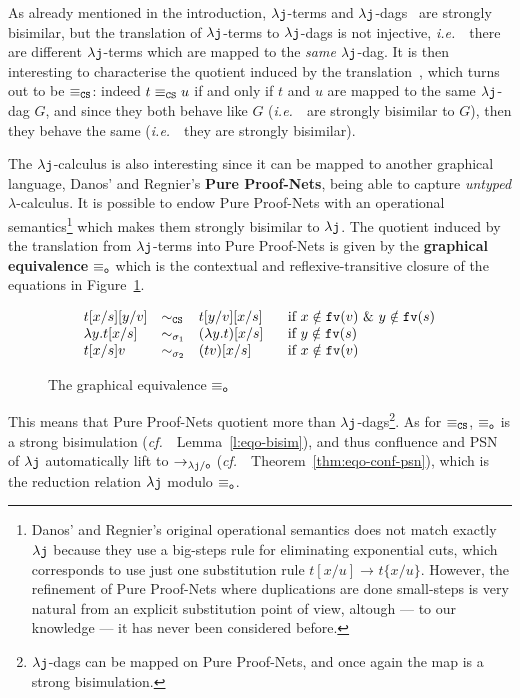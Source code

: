 \documentclass{LMCS}
\newcommand{\ie}{{\it  i.e.}~}
\newcommand{\cf}{{\it  cf.}~}
\renewcommand{\>}{\rightarrow}
\def\lam{\lambda}
\newcommand{\Rew}[1]{\rightarrow_{#1}}
\newcommand{\isubs}[1]{ \{ #1  \} }
\newcommand{\dis}{{\tt j}}
\newcommand{\ldis}{\lam{\dis}}
\newcommand{\lj}{\lam{\dis}}
\newcommand{\fv}[1]{{\tt fv}(#1)}
\newcommand{\CS}{{\tt CS}}
\newcommand{\deft}[1]{{\bf #1}}
\newcommand{\modulo}[2]{#1/#2}
\newcommand{\eqo}{\equiv_\osym}
\newcommand{\preeq}{\sim}
\newcommand{\osym}{{\tt o}}
\newcommand{\preeqsigu}{\preeq_{\sigma_1}}
\newcommand{\preeqsigt}{\preeq_{\sigma_2}}
\newcommand{\eqcs}{\equiv_\CS}
\begin{document}
As already mentioned in the introduction, 
 $\lj$-terms and
$\lj$-dags~\cite{AccattoliTh} are strongly bisimilar, 
but the translation of $\lj$-terms to $\lj$-dags is not
injective, \ie\ there are different $\lj$-terms 
which are mapped to the \textit{same} $\lj$-dag. 
It is then interesting to characterise  the quotient induced by the
translation~\cite{AccattoliTh}, which turns out to be $\eqcs$: indeed $t\eqcs u$ if and only if $t$ and
$u$ are mapped to the same $\lj$-dag $G$, and since they both behave
like $G$ (\ie\  are strongly bisimilar to $G$), then  they behave the same
(\ie\  they are strongly bisimilar).\medskip

The $\lj$-calculus is also 
interesting since it can be mapped
 to another graphical language, Danos' and Regnier's \deft{Pure
  Proof-Nets}, being able to capture
\textit{untyped} $\lam$-calculus. It is possible to endow Pure Proof-Nets
with an operational semantics\footnote{Danos' and Regnier's original
  operational semantics does not match exactly $\lj$ because they use
  a big-steps rule for eliminating exponential cuts, which corresponds
  to use just one substitution rule
  $t[x/u]\Rew{}t\isubs{x/u}$. However, the refinement of Pure
  Proof-Nets where duplications are done small-steps is very natural
  from an explicit substitution point of view, altough --- to our
  knowledge --- it has never been considered before.} which makes them
strongly bisimilar to $\lj$. The quotient
induced by the translation  from $\lj$-terms into Pure Proof-Nets is
given by the \deft{graphical equivalence} $\eqo$ 
which is the contextual
and reflexive-transitive closure of the 
equations in Figure~\ref{f:eqo}. 


\begin{figure}[ht]
\[ \begin{array}{lll@{\hspace{.5cm}}l}
   t[x/s][y/v] & \sim_{\CS} & t[y/v][x/s] & \mbox{ if } x\notin\fv{v}\ \&\ y\notin\fv{s}  \\
   \lam y. t [x/s] & \preeqsigu & (\lam y. t) [x/s]  & \mbox{ if } y\notin \fv{s} \\
   t[x/s] v & \preeqsigt & (t v)[x/s]& \mbox{ if } x\notin\fv{v} \\
   \end{array} \]
\caption{The graphical  equivalence $\eqo$} 
\label{f:eqo}
\end{figure}

This means that Pure Proof-Nets quotient more than
$\lj$-dags\footnote{$\lj$-dags can be mapped on Pure Proof-Nets, and
  once again the map is a strong bisimulation.}. As
for $\equiv_{\CS}$, $\eqo$ is a strong bisimulation
(\cf\ Lemma~\ref{l:eqo-bisim}), and thus confluence and PSN
of $\ldis$ 
automatically lift to $\Rew{\modulo{\ldis}{\osym}}$
(\cf\ Theorem~\ref{thm:eqo-conf-psn}), which is the reduction relation
$\lj$ modulo $\eqo$.\medskip
\end{document}
